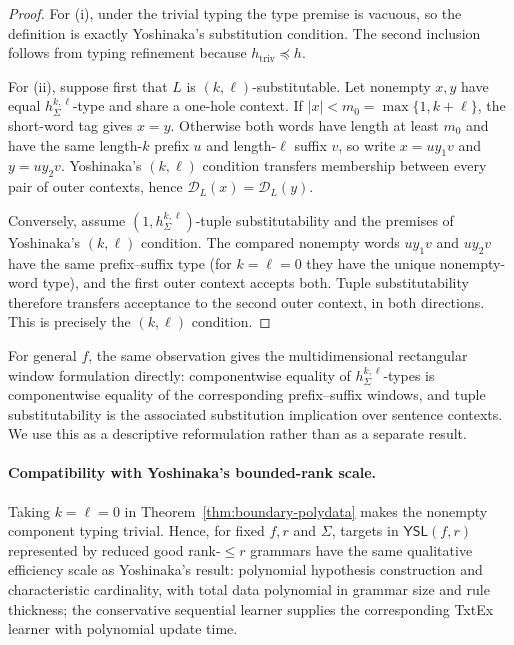\documentclass[11pt]{article}
\numberwithin{equation}{section}
\theoremstyle{plain}
\theoremstyle{definition}
\theoremstyle{remark}
\newcommand{\D}{\mathcal{D}}
\newcommand{\YSL}[2]{\mathsf{YSL}(#1,#2)}
\begin{document}
\begin{proof}
For (i), under the trivial typing the type premise is vacuous, so the
definition is exactly Yoshinaka's substitution condition.  The second
inclusion follows from typing refinement because $h_{\mathrm{triv}}\preceq h$.

For (ii), suppose first that $L$ is $(k,\ell)$-substitutable.  Let nonempty
$x,y$ have equal $h_\Sigma^{k,\ell}$-type and share a one-hole context.  If
$|x|<m_0=\max\{1,k+\ell\}$, the short-word tag gives $x=y$.  Otherwise both
words have length at least $m_0$ and have the same length-$k$ prefix $u$ and
length-$\ell$ suffix $v$, so write $x=uy_1v$ and $y=uy_2v$.  Yoshinaka's
$(k,\ell)$ condition transfers membership between every pair of outer
contexts, hence $\D_L(x)=\D_L(y)$.

Conversely, assume $(1,h_\Sigma^{k,\ell})$-tuple substitutability and the
premises of Yoshinaka's $(k,\ell)$ condition.  The compared nonempty words
$uy_1v$ and $uy_2v$ have the same prefix--suffix type (for $k=\ell=0$ they
have the unique nonempty-word type), and the first outer context accepts both.
Tuple substitutability therefore transfers acceptance to the second outer
context, in both directions.  This is precisely the $(k,\ell)$ condition.
\end{proof}

For general $f$, the same observation gives the multidimensional rectangular
window formulation directly: componentwise equality of
$h_\Sigma^{k,\ell}$-types is componentwise equality of the corresponding
prefix--suffix windows, and tuple substitutability is the associated
substitution implication over sentence contexts.  We use this as a descriptive
reformulation rather than as a separate result.

\paragraph{Compatibility with Yoshinaka's bounded-rank scale.}
Taking $k=\ell=0$ in Theorem~\ref{thm:boundary-polydata} makes the nonempty
component typing trivial.  Hence, for fixed $f,r$ and $\Sigma$, targets in
$\YSL{f}{r}$ represented by reduced good rank-$\le r$ grammars have the same qualitative efficiency scale as Yoshinaka's result: polynomial hypothesis
construction and characteristic cardinality, with total data polynomial in
grammar size and rule thickness; the conservative sequential learner supplies
the corresponding TxtEx learner with polynomial update time.
\end{document}
